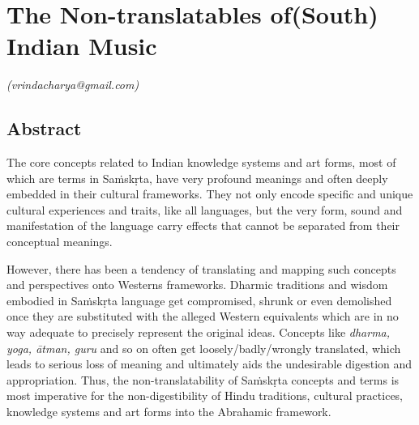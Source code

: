\chapter{The Non-translatables of\break (South) Indian Music}\label{chapter2}


\vspace{-.3cm}


\begin{flushright}
\textit{(vrindacharya@gmail.com)}
\end{flushright}


\section*{Abstract}

The core concepts related to Indian knowledge systems and art forms, most of which are terms in Saṁskṛta, have very profound meanings and often deeply embedded in their cultural frameworks. They not only encode specific and unique cultural experiences and traits, like all languages, but the very form, sound and manifestation of the language carry effects that cannot be separated from their conceptual meanings.

However, there has been a tendency of translating and mapping such concepts and perspectives onto Westerns frameworks. Dharmic traditions and wisdom embodied in Saṁskṛta language get compromised, shrunk or even demolished once they are substituted with the alleged Western equivalents which are in no way adequate to precisely represent the original ideas. Concepts like \textit{dharma, yoga, ātman, guru} and so on often get loosely/badly/wrongly translated, which leads to serious loss of meaning and ultimately aids the undesirable digestion and appropriation. Thus, the non-translatability of Saṁskṛta concepts and terms is most imperative for the non-digestibility of Hindu traditions, cultural practices, knowledge systems and art forms into the Abrahamic framework.

